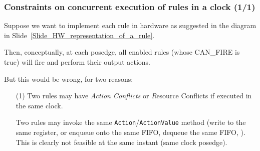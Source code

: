 \begin{frame}[fragile]
\frametitle{Constraints on concurrent execution of rules in a clock (1/1)}

\footnotesize

Suppose we want to implement each rule in hardware as suggested in the
diagram in Slide~\ref{Slide_HW_representation_of_a_rule}.

\vspace{2ex}

Then, conceptually, at each posedge, all enabled rules (whose
CAN\_FIRE is true) will fire and perform their output actions.

\vspace{2ex}

But this would be wrong, for two reasons:

\begin{itemize}

 \item[(1)] Two rules may have \emph{Action Conflicts} or {\emph
       Resource Conflicts} if executed in the same clock.

       \vspace{2ex}

       Two rules may invoke the same {\tt Action}/{\tt ActionValue}
       method (write to the same register, or enqueue onto the same
       FIFO, dequeue the same FIFO, {\etc}).  This is clearly not
       feasible at the same instant (same clock posedge).

\end{itemize}

\end{frame}


